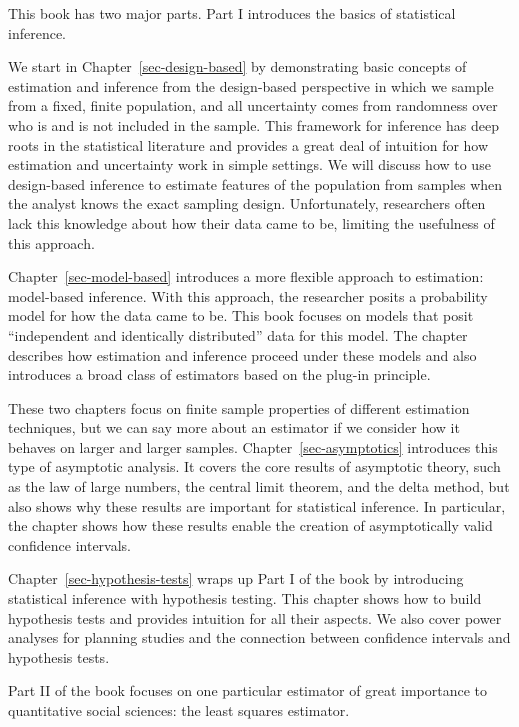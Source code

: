 \documentclass[
  13pt,
  letterpaper,
  DIV=11,
  numbers=noendperiod]{scrreprt}
\theoremstyle{plain}
\theoremstyle{definition}
\theoremstyle{definition}
\theoremstyle{remark}
\begin{document}

This book has two major parts. Part I introduces the basics of
statistical inference.

We start in Chapter~\ref{sec-design-based} by demonstrating basic
concepts of estimation and inference from the design-based perspective
in which we sample from a fixed, finite population, and all uncertainty
comes from randomness over who is and is not included in the sample.
This framework for inference has deep roots in the statistical
literature and provides a great deal of intuition for how estimation and
uncertainty work in simple settings. We will discuss how to use
design-based inference to estimate features of the population from
samples when the analyst knows the exact sampling design. Unfortunately,
researchers often lack this knowledge about how their data came to be,
limiting the usefulness of this approach.

Chapter~\ref{sec-model-based} introduces a more flexible approach to
estimation: model-based inference. With this approach, the researcher
posits a probability model for how the data came to be. This book
focuses on models that posit ``independent and identically distributed''
data for this model. The chapter describes how estimation and inference
proceed under these models and also introduces a broad class of
estimators based on the plug-in principle.

These two chapters focus on finite sample properties of different
estimation techniques, but we can say more about an estimator if we
consider how it behaves on larger and larger samples.
Chapter~\ref{sec-asymptotics} introduces this type of asymptotic
analysis. It covers the core results of asymptotic theory, such as the
law of large numbers, the central limit theorem, and the delta method,
but also shows why these results are important for statistical
inference. In particular, the chapter shows how these results enable the
creation of asymptotically valid confidence intervals.

Chapter~\ref{sec-hypothesis-tests} wraps up Part I of the book by
introducing statistical inference with hypothesis testing. This chapter
shows how to build hypothesis tests and provides intuition for all their
aspects. We also cover power analyses for planning studies and the
connection between confidence intervals and hypothesis tests.

Part II of the book focuses on one particular estimator of great
importance to quantitative social sciences: the least squares estimator.
\end{document}
